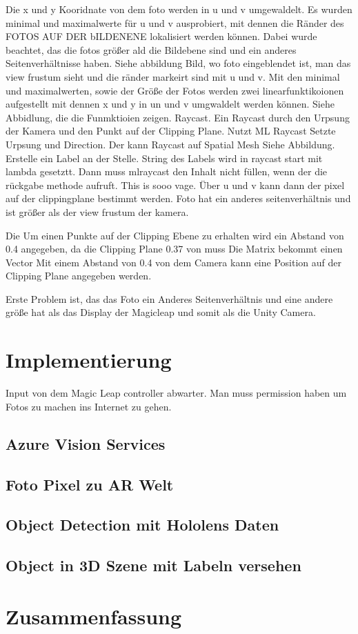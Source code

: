\documentclass[german,a4paper, 12pt]{llncs}
\begin{document}
Die x und y Kooridnate von dem foto werden in u und v umgewaldelt. Es wurden minimal und maximalwerte für u und v ausprobiert, mit dennen die Ränder des FOTOS AUF DER bILDENENE lokalisiert werden können. 
Dabei wurde beachtet, das die fotos größer ald die Bildebene sind und ein anderes Seitenverhältnisse haben.
Siehe abbildung Bild, wo foto eingeblendet ist, man das view frustum sieht und die ränder markeirt sind mit u und v.
Mit den minimal und maximalwerten, sowie der Größe der Fotos werden zwei linearfunktikoionen aufgestellt mit dennen x und y in un und v umgwaldelt werden können. Siehe Abbidlung, die die Funmktioien zeigen. Raycast. 
Ein Raycast durch den Urpsung der Kamera und den Punkt auf der Clipping Plane. Nutzt ML Raycast Setzte Urpsung und Direction. Der kann Raycast auf Spatial Mesh Siehe Abbildung.
Erstelle ein Label an der Stelle. String des Labels wird in raycast start mit lambda gesetztt. Dann muss mlraycast den Inhalt nicht füllen, wenn der die rückgabe methode aufruft. This is sooo vage.
Über u und v kann dann der pixel auf der clippingplane bestimmt werden. 
Foto hat ein anderes seitenverhältnis und ist größer als der view frustum der kamera. 

Die Um einen Punkte auf der Clipping Ebene zu erhalten wird ein Abstand von 0.4 angegeben, da die Clipping Plane 0.37 von muss Die Matrix bekommt einen Vector Mit einem Abstand von 0.4 von dem Camera kann eine Position auf der Clipping Plane angegeben werden. 

Erste Problem ist, das das Foto ein Anderes Seitenverhältnis und eine andere  größe hat als das Display der Magicleap und somit als die Unity Camera. 



\section{Implementierung}
Input von dem Magic Leap controller abwarter. Man muss permission haben um Fotos zu machen ins Internet zu gehen.  



\subsection{Azure Vision Services}

\subsection{Foto Pixel zu AR Welt}

\subsection{Object Detection mit Hololens Daten}
\subsection{Object in 3D Szene mit Labeln versehen}

\section{Zusammenfassung}
	
	\newpage
	\printbibliography
\end{document}
